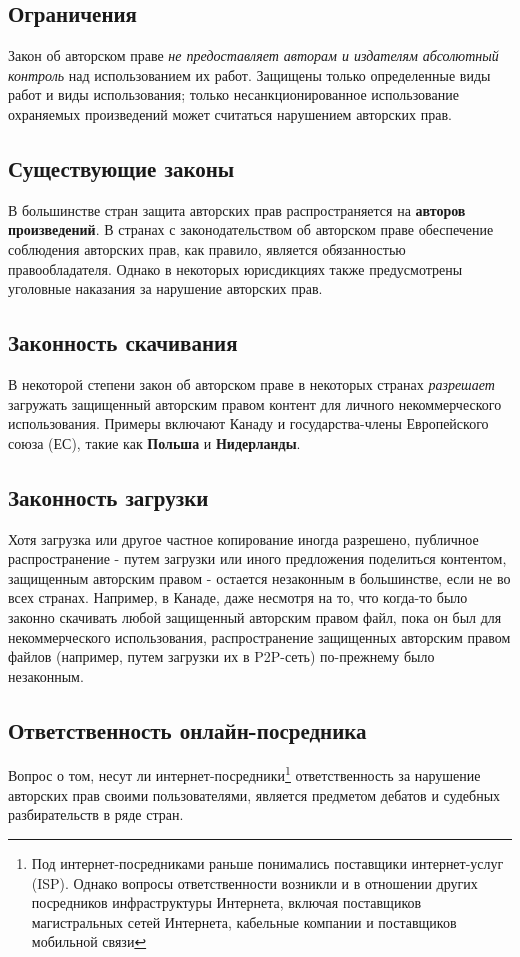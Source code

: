 \documentclass[12pt, oneside, a4paper]{article}
\begin{document}
\begin{sloppypar}
\subsection{Ограничения}
Закон об авторском праве \textit{не предоставляет авторам и издателям абсолютный контроль} над использованием их работ. Защищены только определенные виды работ и виды использования; только несанкционированное использование охраняемых произведений может считаться нарушением авторских прав.

\subsection{Существующие законы}
В большинстве стран защита авторских прав распространяется на \textbf{авторов произведений}. В странах с законодательством об авторском праве обеспечение соблюдения авторских прав, как правило, является обязанностью правообладателя. Однако в некоторых юрисдикциях также предусмотрены уголовные наказания за нарушение авторских прав. 

\subsection{Законность скачивания}
В некоторой степени закон об авторском праве в некоторых странах \textit{разрешает} загружать защищенный авторским правом контент для личного некоммерческого использования. Примеры включают Канаду и государства-члены Европейского союза (ЕС), такие как \textbf{Польша} и \textbf{Нидерланды}.

\subsection{Законность загрузки}
Хотя загрузка или другое частное копирование иногда разрешено, публичное распространение - путем загрузки или иного предложения поделиться контентом, защищенным авторским правом - остается незаконным в большинстве, если не во всех странах. Например, в Канаде, даже несмотря на то, что когда-то было законно скачивать любой защищенный авторским правом файл, пока он был для некоммерческого использования, распространение защищенных авторским правом файлов (например, путем загрузки их в P2P-сеть) по-прежнему было незаконным.

\subsection{Ответственность онлайн-посредника}
Вопрос о том, несут ли интернет-посредники\footnote{Под интернет-посредниками раньше понимались поставщики интернет-услуг (ISP). Однако вопросы ответственности возникли и в отношении других посредников инфраструктуры Интернета, включая поставщиков магистральных сетей Интернета, кабельные компании и поставщиков мобильной связи} ответственность за нарушение авторских прав своими пользователями, является предметом дебатов и судебных разбирательств в ряде стран.


\end{sloppypar}
\end{document}
